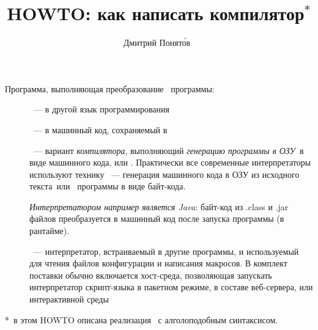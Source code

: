 
\author{Дмитрий Понят\'{о}в\ }
\title{HOWTO: как написать компилятор$^*$}
\secdown
\maketitle
\tableofcontents


Программа, выполняющая преобразование
\ программы:
\begin{description}
	\item[]\label{translator}\ ---
		в другой язык программирования
	\item[]\label{compiler}\ ---
		в машинный код, сохраняемый в 
	\item[]\label{interpreter}\ ---
		вариант \emph{компилятора}, выполняющий \emph{генерацию программы в
		ОЗУ}\ в виде машинного
		кода, или .
		Практически все современные интерпретаторы используют технику
		\ --- генерация машинного кода
		в ОЗУ из исходного текста\ или \ программы в виде
		байт-кода.
		
		\emph{Интерпретатором например является
		Java}:
		байт-код из .class и .jar файлов преобразуется в машинный код
		после запуска программы (в рантайме).
	\item[]\label{script}\ ---
		интерпретатор, встраиваемый в другие программы, и используемый
		для чтения файлов конфигурации и написания макросов. В комплект поставки
		обычно включается хост-среда, позволяющая запускать интерпретатор
		скрипт-языка в пакетном режиме,
		в составе веб-сервера, или интерактивной среды
\end{description}

*\ в этом HOWTO описана реализация \ с
алголоподобным синтаксисом.


